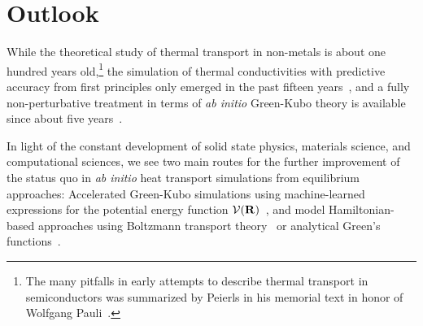 
\section{Outlook}

While the theoretical study of thermal transport in non-metals is about one hundred years old,\footnote{The many pitfalls in early attempts to describe thermal transport in semiconductors was summarized by Peierls in his memorial text in honor of Wolfgang Pauli~\cite{Peierls1960}.} the simulation of thermal conductivities with predictive accuracy from first principles only emerged in the past fifteen years~\cite{Broido2007}, and a fully non-perturbative treatment in terms of \emph{ab initio} Green-Kubo theory is available since about five years~\cite{Marcolongo2016,Carbogno2016}.

In light of the constant development of solid state physics, materials science, and computational sciences, we see two main routes for the further improvement of the status quo in \emph{ab initio} heat transport simulations from equilibrium approaches: Accelerated Green-Kubo simulations using machine-learned expressions for the potential energy function $\mathcal{V} ({\bf R})$~\cite{Korotaev2019,Li2020,Mangold2020}, and model Hamiltonian-based approaches using Boltzmann transport theory~\cite{Simoncelli2019} or analytical Green's functions~\cite{isaeva2019,dangic2021}.

